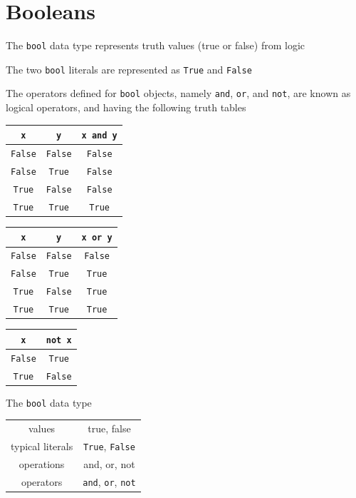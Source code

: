 \documentclass[8pt,a4paper,compress]{beamer}
\begin{document}
\section{Booleans}
\begin{frame}[fragile]
\pause

The \lstinline{bool} data type represents truth values (true or false) from logic 

\pause
\bigskip

The two \lstinline{bool} literals are represented as \lstinline{True} and \lstinline{False}

\pause
\bigskip

The operators defined for \lstinline{bool} objects, namely \lstinline{and}, \lstinline{or}, and \lstinline{not}, are known as logical operators, and having the following truth tables

\begin{center}
\begin{tabular}{cc|c}
\lstinline$x$ & \lstinline$y$ & \lstinline$x and y$ \\ \hline
\lstinline$False$ & \lstinline$False$ & \lstinline$False$ \\
\lstinline$False$ & \lstinline$True$ & \lstinline$False$ \\
\lstinline$True$ & \lstinline$False$ & \lstinline$False$ \\
\lstinline$True$ & \lstinline$True$ & \lstinline$True$
\end{tabular}\hspace{1cm} \begin{tabular}{cc|c}
\lstinline$x$ & \lstinline$y$ & \lstinline$x or y$ \\ \hline
\lstinline$False$ & \lstinline$False$ & \lstinline$False$ \\
\lstinline$False$ & \lstinline$True$ & \lstinline$True$ \\
\lstinline$True$ & \lstinline$False$ & \lstinline$True$ \\
\lstinline$True$ & \lstinline$True$ & \lstinline$True$
\end{tabular}\hspace{1cm} \begin{tabular}{c|c}
\lstinline$x$ & \lstinline$not x$ \\ \hline
\lstinline$False$ & \lstinline$True$ \\
\lstinline$True$ & \lstinline$False$
\end{tabular}
\end{center}

\pause
\bigskip

The \lstinline{bool} data type

\begin{center}
\begin{tabular}{c|c}
values & true, false \\ 
typical literals & \lstinline$True$, \lstinline$False$ \\ 
operations & and, or, not \\
operators & \lstinline$and$, \lstinline$or$, \lstinline$not$
\end{tabular} 
\end{center}
\end{frame}
\end{document}
